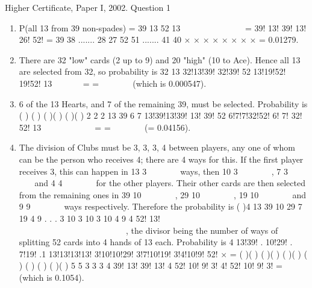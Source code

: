 \documentclass[a4paper,12pt]{article}
\begin{document}
Higher Certificate, Paper I, 2002. Question 1
\begin{enumerate}
\item  P(all 13 from 39 non-spades) =
39
13
52
13
 
 
 
 
 
 
= 39! 13! 39!
13! 26! 52!
= 39 38 ....... 28 27
52 51 ....... 41 40
× × × ×
× × × ×
= 0.01279.
\item  There are 32 "low" cards (2 up to 9) and 20 "high" (10 to Ace). Hence all 13
are selected from 32, so probability is
32
13 32!13!39! 32!39!
52 13!19!52! 19!52!
13
 
 
 = =
 
 
 
(which is 0.000547).
\item  6 of the 13 Hearts, and 7 of the remaining 39, must be selected.
Probability is ( ) ( )
( )( ) ( )( )
2 2
2
13 39
6 7 13!39!13!39! 13! 39!
52 6!7!7!32!52! 6! 7! 32! 52!
13
  
  
  = =
 
 
 
(= 0.04156).
\item The division of Clubs must be 3, 3, 3, 4 between players, any one of whom
can be the person who receives 4; there are 4 ways for this. If the first player
receives 3, this can happen in
13
3
 
 
 
ways, then
10
3
 
 
 
,
7
3
 
 
 
and
4
4
 
 
 
for the other
players. Their other cards are then selected from the remaining ones in
39
10
 
 
 
,
29
10
 
 
 
,
19
10
 
 
 
and
9
9
 
 
 
ways respectively. Therefore the probability is
( )4
13 39 10 29 7 19 4 9
. . .
3 10 3 10 3 10 4 9
4
52!
13!
           
           
           
 
 
 
, the divisor being the number of ways of
splitting 52 cards into 4 hands of 13 each.
Probability is 4 13!39! . 10!29! . 7!19! .1 13!13!13!13!
3!10!10!29! 3!7!10!19! 3!4!10!9! 52!
×
= ( )( )
( )( ) ( )( ) ( )
( )
( ) ( )( )
5 5
3 3 3 4
39! 13! 39! 13!
4
52! 10! 9! 3! 4! 52! 10! 9! 3!
= (which is 0.1054).
\end{enumerate}
\end{document}
